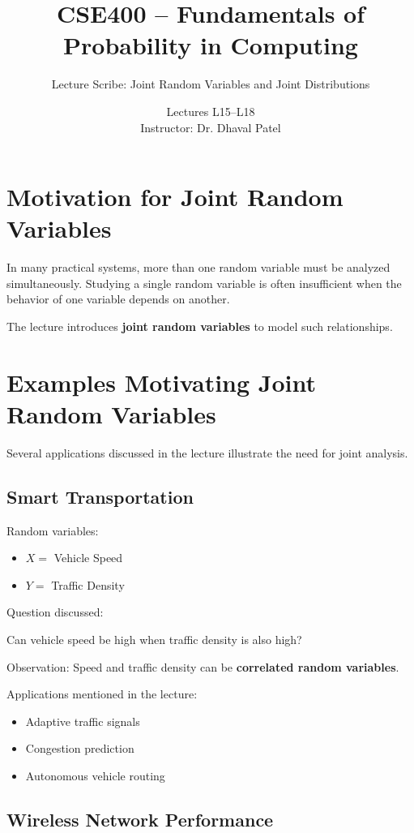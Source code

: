 \documentclass[12pt]{article}
\title{CSE400 -- Fundamentals of Probability in Computing}
\author{Lecture Scribe: Joint Random Variables and Joint Distributions}
\date{Lectures L15--L18 \\ Instructor: Dr. Dhaval Patel}
\begin{document}
\maketitle

\section{Motivation for Joint Random Variables}

In many practical systems, more than one random variable must be analyzed simultaneously. Studying a single random variable is often insufficient when the behavior of one variable depends on another.

The lecture introduces \textbf{joint random variables} to model such relationships.

\section{Examples Motivating Joint Random Variables}

Several applications discussed in the lecture illustrate the need for joint analysis.

\subsection{Smart Transportation}

Random variables:

\begin{itemize}
\item $X =$ Vehicle Speed
\item $Y =$ Traffic Density
\end{itemize}

Question discussed:

Can vehicle speed be high when traffic density is also high?

Observation:  
Speed and traffic density can be \textbf{correlated random variables}.

Applications mentioned in the lecture:

\begin{itemize}
\item Adaptive traffic signals
\item Congestion prediction
\item Autonomous vehicle routing
\end{itemize}

\subsection{Wireless Network Performance}
\end{document}

